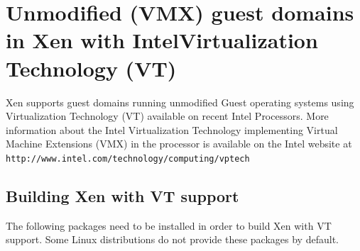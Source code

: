 \documentclass[11pt,twoside,final,openright]{report}
\begin{document}

\appendix

\chapter{Unmodified (VMX) guest domains in Xen with Intel\textregistered Virtualization Technology (VT)}

Xen supports guest domains running unmodified Guest operating systems using Virtualization Technology (VT) available on recent Intel Processors. More information about the Intel Virtualization Technology implementing Virtual Machine Extensions (VMX) in the processor is available on the Intel website at \\
 {\small {\tt http://www.intel.com/technology/computing/vptech}}

\section{Building Xen with VT support}

The following packages need to be installed in order to build Xen with VT support. Some Linux distributions do not provide these packages by default.
\end{document}
